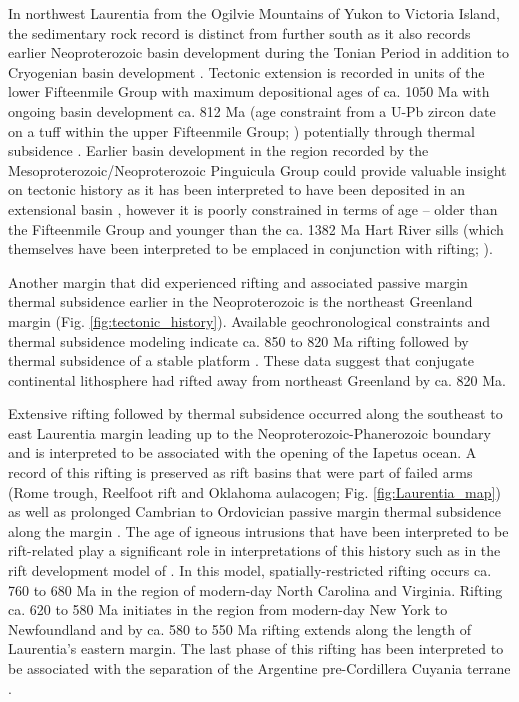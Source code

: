 \documentclass[11pt,letterpaper]{article}
\begin{document}
In northwest Laurentia from the Ogilvie Mountains of Yukon to Victoria Island, the sedimentary rock record is distinct from further south as it also records earlier Neoproterozoic basin development during the Tonian Period in addition to Cryogenian basin development \citep{Macdonald2012a}. Tectonic extension is recorded in units of the lower Fifteenmile Group with maximum depositional ages of ca. 1050 Ma with ongoing basin development ca. 812 Ma (age constraint from a U-Pb zircon date on a tuff within the upper Fifteenmile Group; \citealp{Macdonald2010a}) potentially through thermal subsidence \citep{Macdonald2012a}. Earlier basin development in the region recorded by the Mesoproterozoic/Neoproterozoic Pinguicula Group could provide valuable insight on tectonic history as it has been interpreted to have been deposited in an extensional basin \citep{Medig2016a}, however it is poorly constrained in terms of age -- older than the Fifteenmile Group and younger than the ca. 1382 Ma Hart River sills (which themselves have been interpreted to be emplaced in conjunction with rifting; \citealp{Verbaas2018a}).

Another margin that did experienced rifting and associated passive margin thermal subsidence earlier in the Neoproterozoic is the northeast Greenland margin (Fig. \ref{fig:tectonic_history}). Available geochronological constraints and thermal subsidence modeling indicate ca. 850 to 820 Ma rifting followed by thermal subsidence of a stable platform \citep{Maloof2006a, Halverson2018a}. These data suggest that conjugate continental lithosphere had rifted away from northeast Greenland by ca. 820 Ma. 

Extensive rifting followed by thermal subsidence occurred along the southeast to east Laurentia margin leading up to the Neoproterozoic-Phanerozoic boundary and is interpreted to be associated with the opening of the Iapetus ocean. A record of this rifting is preserved as rift basins that were part of failed arms (Rome trough, Reelfoot rift and Oklahoma aulacogen; Fig. \ref{fig:Laurentia_map}) as well as prolonged Cambrian to Ordovician passive margin thermal subsidence along the margin \citep{Bond1984a, Whitmeyer2007a}. The age of igneous intrusions that have been interpreted to be rift-related play a significant role in interpretations of this history such as in the rift development model of \citet{Burton2010a}. In this model, spatially-restricted rifting occurs ca. 760 to 680 Ma in the region of modern-day North Carolina and Virginia. Rifting ca. 620 to 580 Ma initiates in the region from modern-day New York to Newfoundland and by ca. 580 to 550 Ma rifting extends along the length of Laurentia's eastern margin. The last phase of this rifting has been interpreted to be associated with the separation of the Argentine pre-Cordillera Cuyania terrane \citep{Dickerson1998a}. 
\end{document}

